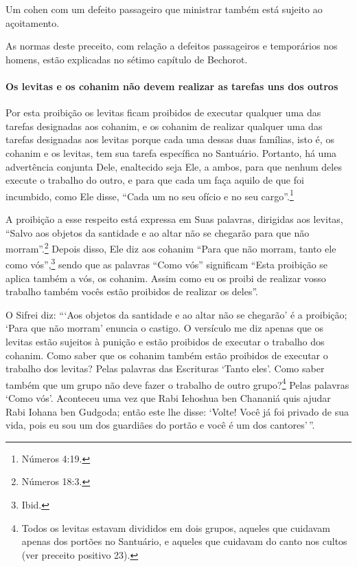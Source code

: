 \begin{multicols}{2}
Um cohen\starr{} com um defeito passageiro que ministrar também está
sujeito ao açoitamento.

As normas deste preceito, com relação a defeitos passageiros e
temporários nos homens, estão explicadas no sétimo capítulo de Bechorot\starr.

\paragraph{Os levitas\starr{} e os cohanim\starr{} não devem realizar as tarefas uns dos outros}

Por esta proibição os levitas\starr{} ficam proibidos de executar qualquer uma
das tarefas designadas aos cohanim\starr, e os cohanim\starr{} de realizar
qualquer uma das tarefas designadas aos levitas\starr{} porque cada uma dessas
duas famílias, isto é, os cohanim\starr{} e os levitas\starr, tem sua tarefa
específica no Santuário. Portanto, há uma advertência conjunta Dele,
enaltecido seja Ele, a ambos, para que nenhum deles execute o trabalho
do outro, e para que cada um faça aquilo de que foi incumbido, como Ele
disse, ``Cada um no seu ofício e no seu cargo''.\footnote{Números 4:19.}

A proibição a esse respeito está expressa em Suas palavras, dirigidas
aos levitas\starr, ``Salvo aos objetos da santidade e ao altar não se chegarão
para que não morram''.\footnote{Números 18:3.} Depois disso, Ele diz aos
cohanim\starr{} ``Para que não morram, tanto ele como vós'',\footnote{Ibid.} sendo
que as palavras ``Como vós'' significam ``Esta proibição se aplica
também a vós, os cohanim\starr. Assim como eu os proibi de realizar vosso
trabalho também vocês estão proibidos de realizar os deles''.

O Sifrei\starr{} diz: ```Aos objetos da santidade e ao altar não se chegarão' é
a proibição; `Para que não morram' enuncia o castigo. O versículo me diz
apenas que os levitas\starr{} estão sujeitos à punição e estão proibidos de
executar o trabalho dos cohanim\starr. Como saber que os cohanim\starr{} também
estão proibidos de executar o trabalho dos levitas\starr? Pelas palavras das
Escrituras `Tanto eles'. Como saber também que um grupo não deve fazer o
trabalho de outro grupo?\footnote{Todos os levitas\starr{} estavam divididos em dois grupos, aqueles que cuidavam apenas dos portões no Santuário, e aqueles que cuidavam do
canto nos cultos (ver preceito positivo 23).} Pelas palavras `Como
vós'. Aconteceu uma vez que Rabi Iehoshua ben Chananiá\starr{} quis ajudar Rabi
Iohana ben Gudgoda\starr; então este lhe disse: `Volte! Você já foi privado
de sua vida, pois eu sou um dos guardiães do portão e você é um dos
cantores'\,''.


\end{multicols}
